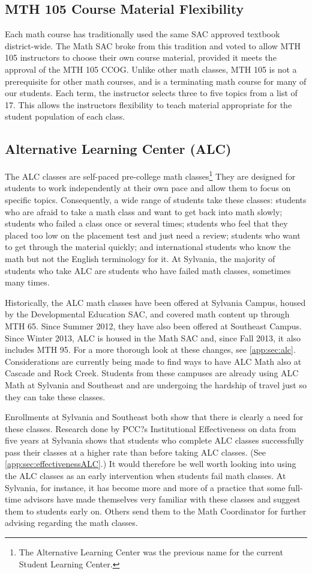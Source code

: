 \subsection{MTH 105 Course Material Flexibility}
Each math course has traditionally used the same SAC approved textbook
district-wide.  The Math SAC broke from this tradition and voted to allow MTH
105 instructors to choose their own course material, provided it meets the
approval of the MTH 105 CCOG.  Unlike other math classes, MTH 105 is not a
prerequisite for other math courses, and is a terminating math course for many
of our students.  Each term, the instructor selects three to five topics from a
list of 17.  This allows the instructors flexibility to teach material
appropriate for the student population of each class.

\subsection{Alternative Learning Center (ALC)}
The ALC classes are self-paced pre-college math classes\footnote{The Alternative
Learning Center was the previous name for the current Student Learning Center.}
They are designed for students to work independently at their own pace and allow
them to focus on specific topics.  Consequently, a wide range of students take
these classes: students who are afraid to take a math class and want to get back
into math slowly; students who failed a class once or several times; students
who feel that they placed too low on the placement test and just need a review;
students who want to get through the material quickly; and international
students who know the math but not the English terminology for it.  At Sylvania,
the majority of students who take ALC are students who have failed math classes,
sometimes many times.

Historically, the ALC math classes have been offered at Sylvania Campus, housed
by the Developmental Education SAC, and covered math content up through MTH 65.
Since Summer 2012, they have also been offered at Southeast Campus.  Since
Winter 2013, ALC is housed in the Math SAC and, since Fall 2013, it also
includes MTH 95. For a more thorough look at these changes, see
\vref{app:sec:alc}. Considerations are currently being made to find ways to have
ALC Math also at Cascade and Rock Creek.  Students from these campuses are
already using ALC Math at Sylvania and Southeast and are undergoing the hardship
of travel just so they can take these classes.

Enrollments at Sylvania and Southeast both show that there is clearly a need for
these classes.  Research done by PCC?s Institutional Effectiveness on data from
five years at Sylvania shows that students who complete ALC classes successfully
pass their classes at a higher rate than before taking ALC classes.  (See
\vref{app:sec:effectivenessALC}.)  It would therefore be well worth looking into
using the ALC classes as an early intervention when students fail math classes.
At Sylvania, for instance, it has become more and more of a practice that some
full-time advisors have made themselves very familiar with these classes and
suggest them to students early on.  Others send them to the Math Coordinator for
further advising regarding the math classes.
 
